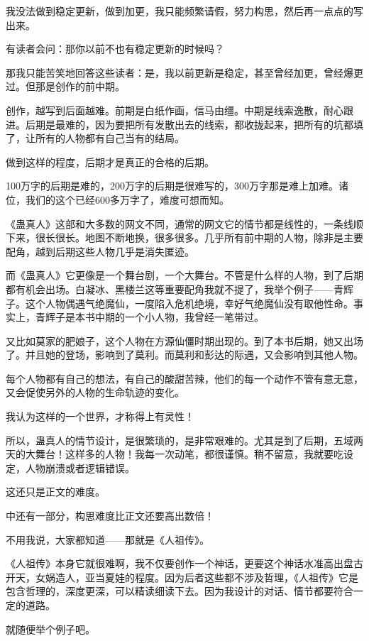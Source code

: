 \begin{this_body}
我没法做到稳定更新，做到加更，我只能频繁请假，努力构思，然后再一点点的写出来。

有读者会问：那你以前不也有稳定更新的时候吗？

那我只能苦笑地回答这些读者：是，我以前更新是稳定，甚至曾经加更，曾经爆更过。但那是创作的前中期。

创作，越写到后面越难。前期是白纸作画，信马由缰。中期是线索逸散，耐心跟进。后期是最难的，因为要把所有发散出去的线索，都收拢起来，把所有的坑都填了，让所有的人物都有自己当有的结局。

做到这样的程度，后期才是真正的合格的后期。

100万字的后期是难的，200万字的后期是很难写的，300万字那是难上加难。诸位，我们的这个已经600多万字了，难度可想而知。

《蛊真人》这部和大多数的网文不同，通常的网文它的情节都是线性的，一条线顺下来，很长很长。地图不断地换，很多很多。几乎所有前中期的人物，除非是主要配角，越到后期这些人物几乎是消失匿迹。

而《蛊真人》它更像是一个舞台剧，一个大舞台。不管是什么样的人物，到了后期都有机会出场。白凝冰、黑楼兰这等重要配角我就不提了，我举个例子——青辉子。这个人物偶遇气绝魔仙，一度陷入危机绝境，幸好气绝魔仙没有取他性命。事实上，青辉子是本书中期的一个小人物，我曾经一笔带过。

又比如莫家的肥娘子，这个人物在方源仙僵时期出现的。到了本书后期，她又出场了。并且她的登场，影响到了莫利。而莫利和彭达的际遇，又会影响到其他人物。

每个人物都有自己的想法，有自己的酸甜苦辣，他们的每一个动作不管有意无意，又会促使另外的人物的生命轨迹的变化。

我认为这样的一个世界，才称得上有灵性！

所以，蛊真人的情节设计，是很繁琐的，是非常艰难的。尤其是到了后期，五域两天的大舞台！这样多的人物！我每一次动笔，都很谨慎。稍不留意，我就要吃设定，人物崩溃或者逻辑错误。

这还只是正文的难度。

中还有一部分，构思难度比正文还要高出数倍！

不用我说，大家都知道——那就是《人祖传》。

《人祖传》本身它就很难啊，我不仅要创作一个神话，更要这个神话水准高出盘古开天，女娲造人，亚当夏娃的程度。因为后者这些都不涉及哲理，《人祖传》它是包含哲理的，深度更深，可以精读细读下去。因为我设计的对话、情节都要符合一定的道路。

就随便举个例子吧。


\end{this_body}
